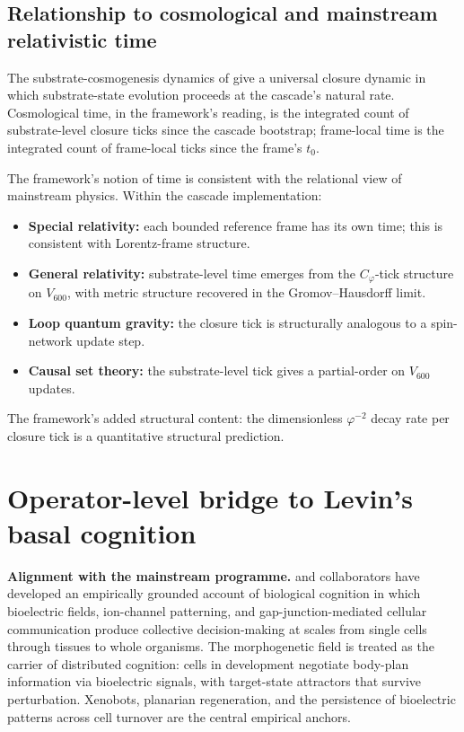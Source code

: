 \documentclass[11pt]{article}
\theoremstyle{plain}
\theoremstyle{definition}
\theoremstyle{remark}
\newcommand{\Cph}{C_\varphi}
\begin{document}
\subsection{Relationship to cosmological and mainstream relativistic time}

The substrate-cosmogenesis dynamics of \citet{SmartClosureCosmogenesis} give a universal closure dynamic in which substrate-state evolution proceeds at the cascade's natural rate. Cosmological time, in the framework's reading, is the integrated count of substrate-level closure ticks since the cascade bootstrap; frame-local time is the integrated count of frame-local ticks since the frame's $t_0$.

The framework's notion of time is consistent with the relational view of mainstream physics. Within the cascade implementation:
\begin{itemize}[leftmargin=2em]
\item \textbf{Special relativity:} each bounded reference frame has its own time; this is consistent with Lorentz-frame structure.
\item \textbf{General relativity:} substrate-level time emerges from the $\Cph$-tick structure on $V_{600}$, with metric structure recovered in the Gromov--Hausdorff limit.
\item \textbf{Loop quantum gravity:} the closure tick is structurally analogous to a spin-network update step.
\item \textbf{Causal set theory:} the substrate-level tick gives a partial-order on $V_{600}$ updates.
\end{itemize}

The framework's added structural content: the dimensionless $\varphi^{-2}$ decay rate per closure tick is a quantitative structural prediction.

\section{Operator-level bridge to Levin's basal cognition}\label{sec:levin}

\textbf{Alignment with the mainstream programme.} \citet{LevinBasalCognition} and collaborators have developed an empirically grounded account of biological cognition in which bioelectric fields, ion-channel patterning, and gap-junction-mediated cellular communication produce collective decision-making at scales from single cells through tissues to whole organisms. The morphogenetic field is treated as the carrier of distributed cognition: cells in development negotiate body-plan information via bioelectric signals, with target-state attractors that survive perturbation. Xenobots, planarian regeneration, and the persistence of bioelectric patterns across cell turnover are the central empirical anchors.
\end{document}
